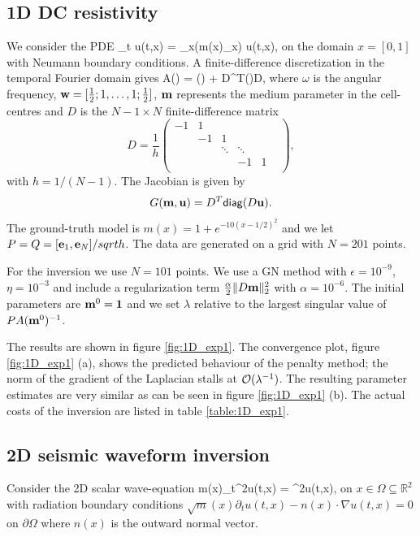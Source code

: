 \documentclass{iopart}
\begin{document}
\subsection{1D DC resistivity}
We consider the PDE
\bq
\partial_t u(t,x) = \partial_x\left(m(x)\partial_x\right) u(t,x),
\eq
on the domain $x = [0,1]$ with Neumann boundary conditions. 
A finite-difference discretization in the temporal Fourier domain gives
\bq
A() = \imath\omega{}() + D^T()D,
\eq
where $\omega$ is the angular frequency, $\mathbf{w} = [\frac{1}{2}; 1, \ldots, 1; \frac{1}{2}]$, $\mathbf{m}$ represents 
the medium parameter in the cell-centres and $D$ is the $N-1\times N$ finite-difference matrix
\[
D=\frac{1}{h}\left(\begin{array}{cccccc} 
-1& 1&   &  &      &   \\
  &-1& 1 &  &      &   \\
  &  &\ddots&\ddots&   \\
  &  &      & -1   & 1 \\
\end{array}\right),
\]
with $h=1/(N-1)$. The Jacobian is given by 
\[
G(\mathbf{m},\mathbf{u}) = D^T\mathsf{diag}(D\mathbf{u}).
\]
The ground-truth model is $m(x) = 1+e^{-10(x-1/2)^2}$ and we let $P = Q = [\mathbf{e}_1, \mathbf{e}_{N}]/sqrt{h}$. 
The data are generated on a grid with $N=201$ points.

For the inversion we use $N=101$ points.
We use a GN method with $\epsilon=10^{-9}$, $\eta=10^{-3}$ and include a regularization term $\frac{\alpha}{2} \|D\mathbf{m}\|_2^2$ with $\alpha = 10^{-6}$.
The initial parameters are $\mathbf{m}^0 = \mathbf{1}$ and we set $\lambda$ relative to the largest singular value of $PA(\mathbf{m}^0)^{-1}$.

The results are shown in figure \ref{fig:1D_exp1}. The convergence plot, figure \ref{fig:1D_exp1} (a), shows the predicted behaviour of the penalty method; the norm
of the gradient of the Laplacian stalls at $\mathcal{O}(\lambda^{-1})$. The resulting parameter estimates are very similar as can be seen 
in figure \ref{fig:1D_exp1} (b). The actual costs of the inversion are listed in table \ref{table:1D_exp1}.

\subsection{2D seismic waveform inversion}
Consider the 2D scalar wave-equation
\bq
m(x)\partial_t^2u(t,x) = \nabla^2u(t,x),
\eq
on $x \in \Omega \subseteq \mathbb{R}^2$  with radiation boundary conditions $\sqrt{m}(x)\partial_tu(t,x) - n(x)\cdot\nabla u(t,x) = 0$ on $\partial\Omega$
where $n(x)$ is the outward normal vector.
\end{document}
